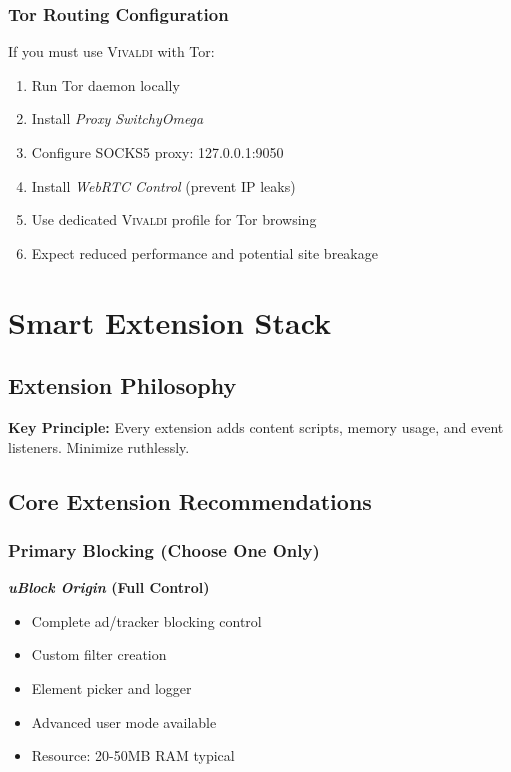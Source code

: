 \documentclass[11pt,a4paper,oneside]{book}
\newcommand{\vivaldi}{\textsc{Vivaldi}}
\newcommand{\extension}[1]{\textit{\color{primaryblue}#1}}
\begin{document}
\subsection{Tor Routing Configuration}

If you must use \vivaldi{} with Tor:

\begin{enumerate}
    \item Run Tor daemon locally
    \item Install \extension{Proxy SwitchyOmega}
    \item Configure SOCKS5 proxy: 127.0.0.1:9050
    \item Install \extension{WebRTC Control} (prevent IP leaks)
    \item Use dedicated \vivaldi{} profile for Tor browsing
    \item Expect reduced performance and potential site breakage
\end{enumerate}

\chapter{Smart Extension Stack}

\section{Extension Philosophy}

\begin{tipbox}
\textbf{Key Principle:} Every extension adds content scripts, memory usage, and event listeners. Minimize ruthlessly.
\end{tipbox}

\section{Core Extension Recommendations}

\subsection{Primary Blocking (Choose One Only)}

\textbf{\extension{uBlock Origin} (Full Control)}
\begin{itemize}
    \item Complete ad/tracker blocking control
    \item Custom filter creation
    \item Element picker and logger
    \item Advanced user mode available
    \item Resource: 20-50MB RAM typical
\end{itemize}
\end{document}
